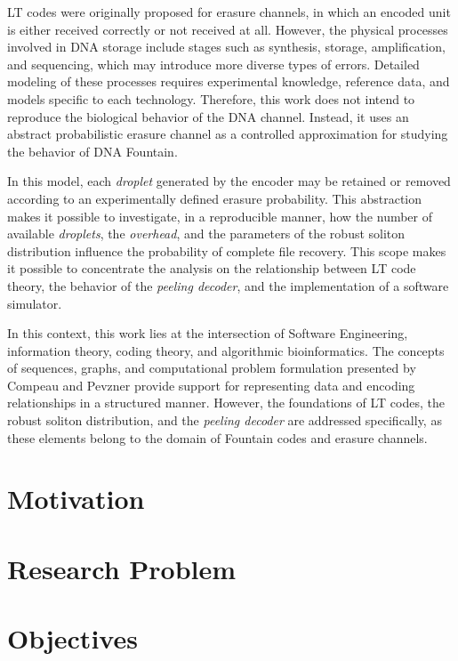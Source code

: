 LT codes were originally proposed for erasure channels, in which an encoded unit is either received correctly or not received at all. However, the physical processes involved in DNA storage include stages such as synthesis, storage, amplification, and sequencing, which may introduce more diverse types of errors. Detailed modeling of these processes requires experimental knowledge, reference data, and models specific to each technology. Therefore, this work does not intend to reproduce the biological behavior of the DNA channel. Instead, it uses an abstract probabilistic erasure channel as a controlled approximation for studying the behavior of DNA Fountain.

In this model, each \emph{droplet} generated by the encoder may be retained or removed according to an experimentally defined erasure probability. This abstraction makes it possible to investigate, in a reproducible manner, how the number of available \emph{droplets}, the \emph{overhead}, and the parameters of the robust soliton distribution influence the probability of complete file recovery. This scope makes it possible to concentrate the analysis on the relationship between LT code theory, the behavior of the \emph{peeling decoder}, and the implementation of a software simulator.

In this context, this work lies at the intersection of Software Engineering, information theory, coding theory, and algorithmic bioinformatics. The concepts of sequences, graphs, and computational problem formulation presented by Compeau and Pevzner \cite{compeau2018} provide support for representing data and encoding relationships in a structured manner. However, the foundations of LT codes, the robust soliton distribution, and the \emph{peeling decoder} are addressed specifically, as these elements belong to the domain of Fountain codes and erasure channels.

\section{Motivation}

\section{Research Problem}

\section{Objectives}

